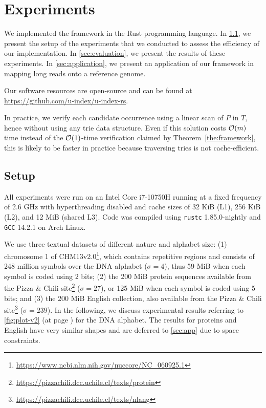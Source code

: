 \section{Experiments}\label{sec:experiments}

We implemented the {\uindex} framework in the Rust programming language.
In \cref{sec:setup}, we present the setup of the experiments that we conducted to assess the efficiency of our implementation.
In \cref{sec:evaluation}, we present the results of these experiments.
In \cref{sec:application}, we present an application of our framework in mapping long reads onto a reference genome.


Our software resources are open-source and can be found at \url{https://github.com/u-index/u-index-rs}.

In practice, we verify each candidate occurrence using a linear scan of $P$ in
$T$, hence without using any trie data structure. Even if this solution costs
$\mathcal{O}(m)$ time instead of the $\mathcal{O}(1)$-time verification claimed by
Theorem~\ref{the:framework}, this is likely to be faster in practice because
traversing tries is not cache-efficient.

\subsection{Setup}\label{sec:setup}

All experiments were run on an Intel Core
i7-10750H running at a fixed frequency of 2.6 GHz with hyperthreading disabled
and cache sizes of 32 KiB (L1), 256 KiB (L2), and 12 MiB (shared L3). Code was
compiled using \verb|rustc| 1.85.0-nightly and \verb|GCC|
14.2.1 on Arch Linux.

We use three textual datasets of different nature and alphabet size:
(1) chromosome 1 of
CHM13v2.0\footnote{\url{https://www.ncbi.nlm.nih.gov/nuccore/NC_060925.1}},
which contains repetitive regions and consists of 248 million symbols over the DNA alphabet ($\sigma=4$),
thus 59 MiB when each symbol is coded using 2 bits;
(2) the 200 MiB protein sequences available from the Pizza \& Chili site\footnote{\url{https://pizzachili.dcc.uchile.cl/texts/protein}} ($\sigma=27$), or 125 MiB when each symbol is coded using 5 bits;
and (3) the 200 MiB English collection, also available from the Pizza \& Chili site\footnote{\url{https://pizzachili.dcc.uchile.cl/texts/nlang}} ($\sigma=239$).
In the following, we discuss experimental results referring to \cref{fig:plot-v2} (at page \pageref{fig:plot-v2}) for the DNA alphabet. The results for proteins and English have very similar shapes and are deferred to \cref{sec:app} due to space constraints.

